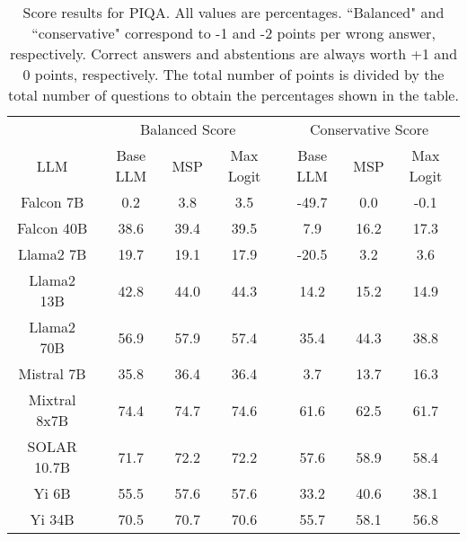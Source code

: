 \begin{table*}
\centering
\begin{tabular}{c|c|c|c|c|c|c}
& \multicolumn{3}{c|}{Balanced Score} & \multicolumn{3}{c}{Conservative Score} \\ 
LLM & Base LLM & MSP & Max Logit & Base LLM & MSP & Max Logit\\ \hline
Falcon 7B & 0.2 & 3.8 & 3.5 & -49.7 & 0.0 & -0.1\\
Falcon 40B & 38.6 & 39.4 & 39.5 & 7.9 & 16.2 & 17.3\\
Llama2 7B & 19.7 & 19.1 & 17.9 & -20.5 & 3.2 & 3.6\\
Llama2 13B & 42.8 & 44.0 & 44.3 & 14.2 & 15.2 & 14.9\\
Llama2 70B & 56.9 & 57.9 & 57.4 & 35.4 & 44.3 & 38.8\\
Mistral 7B & 35.8 & 36.4 & 36.4 & 3.7 & 13.7 & 16.3\\
Mixtral 8x7B & 74.4 & 74.7 & 74.6 & 61.6 & 62.5 & 61.7\\
SOLAR 10.7B & 71.7 & 72.2 & 72.2 & 57.6 & 58.9 & 58.4\\
Yi 6B & 55.5 & 57.6 & 57.6 & 33.2 & 40.6 & 38.1\\
Yi 34B & 70.5 & 70.7 & 70.6 & 55.7 & 58.1 & 56.8\\
\hline
\end{tabular}
\caption{Score results for PIQA. All values are percentages. ``Balanced" and ``conservative" correspond to -1 and -2 points per wrong answer, respectively. Correct answers and abstentions are always worth +1 and 0 points, respectively. The total number of points is divided by the total number of questions to obtain the percentages shown in the table.}
\label{tab:piqa_score}
\end{table*}
